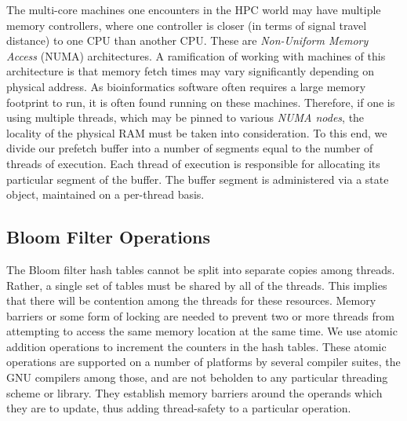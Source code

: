 The multi-core machines one encounters in the HPC world may have multiple
memory controllers, where one controller is closer (in terms of signal travel
distance) to one CPU than another CPU. These are \textit{Non-Uniform Memory
Access} (NUMA) architectures. A ramification of working with machines of this
architecture is that memory fetch times may vary significantly depending on
physical address. As bioinformatics software often requires a large memory
footprint to run, it is often found running on these machines. Therefore, if
one is using multiple threads, which may be pinned to various \textit{NUMA
nodes}, the locality of the physical RAM must be taken into consideration. To
this end, we divide our prefetch buffer into a number of segments equal to the
number of threads of execution. Each thread of execution is responsible for
allocating its particular segment of the buffer. The buffer segment is
administered via a state object, maintained on a per-thread basis.

\subsection{Bloom Filter Operations}

The Bloom filter hash tables cannot be split into separate copies among
threads. Rather, a single set of tables must be shared by all of the threads.
This implies that there will be contention among the threads for these
resources. Memory barriers \citep{web:membar} or some form of locking are
needed to prevent two or more threads from attempting to access the same memory
location at the same time. We use atomic addition operations to increment the
counters in the hash tables. These atomic operations \citep{web:atomics} are
supported on a number of platforms by several compiler suites, the GNU
compilers among those, and are not beholden to any particular threading scheme
or library. They establish memory barriers around the operands which they are
to update, thus adding thread-safety to a particular operation.

